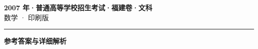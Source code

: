 \documentclass[zihao=5, a4paper]{ctexart}
\begin{document}
\begin{center}
  {\Large\bfseries 2007 年·普通高等学校招生考试·福建卷·文科}\\[4pt]
  {\large 数学 · 印刷版}
\end{center}
\medskip
{}

\par\bigskip\hrule\bigskip
{}
\begin{center}{\large\bfseries 参考答案与详细解析}\end{center}
\smallskip

\end{document}
